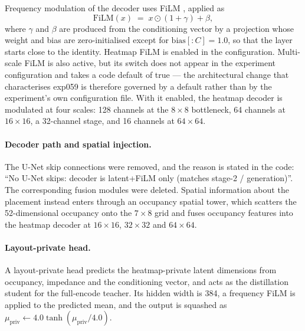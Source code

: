 Frequency modulation of the decoder uses FiLM \cite{perez2018film}, applied as
\begin{equation}
\mathrm{FiLM}(x) \;=\; x \odot (1 + \gamma) + \beta ,
\label{eq:film}
\end{equation}
where $\gamma$ and $\beta$ are produced from the conditioning vector by a projection whose weight and
bias are zero-initialised except for $\mathrm{bias}[:C] = 1.0$, so that the layer starts close to the
identity. Heatmap FiLM is enabled in the configuration. Multi-scale FiLM is also active, but its
switch does not appear in the experiment configuration and takes a code default of true --- the
architectural change that characterises exp059 is therefore governed by a default rather than by the
experiment's own configuration file. With it enabled, the heatmap decoder is modulated at four
scales: 128 channels at the $8 \times 8$ bottleneck, 64 channels at $16 \times 16$, a 32-channel
stage, and 16 channels at $64 \times 64$.

\paragraph{Decoder path and spatial injection.} The U-Net skip connections were removed, and the
reason is stated in the code: ``No U-Net skips: decoder is latent+FiLM only (matches stage-2 /
generation)''. The corresponding fusion modules were deleted. Spatial information about the placement
instead enters through an occupancy spatial tower, which scatters the 52-dimensional occupancy onto
the $7 \times 8$ grid and fuses occupancy features into the heatmap decoder at $16 \times 16$,
$32 \times 32$ and $64 \times 64$.

\paragraph{Layout-private head.} A layout-private head predicts the heatmap-private latent dimensions
from occupancy, impedance and the conditioning vector, and acts as the distillation student for the
full-encode teacher. Its hidden width is 384, a frequency FiLM is applied to the predicted mean, and
the output is squashed as $\mu_{\mathrm{priv}} \leftarrow 4.0 \tanh(\mu_{\mathrm{priv}} / 4.0)$.

